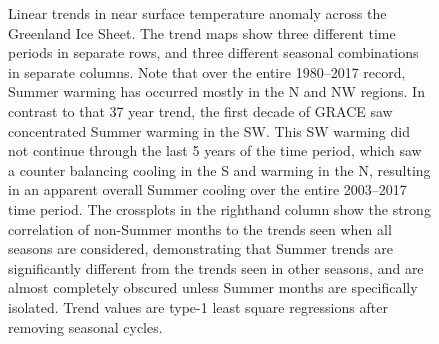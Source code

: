 \documentclass[11pt]{report}
\begin{document}
 \begin{figure}[h]
\centering
{}
\caption[Spatial Variability of Temperature Anomaly Trends]{Linear trends in near surface temperature anomaly across the Greenland Ice Sheet. The trend maps show three different time periods in separate rows, and three different seasonal combinations in separate columns. Note that over the entire 1980--2017 record, Summer warming has occurred mostly in the N and NW regions. In contrast to that 37 year trend, the first decade of GRACE saw concentrated Summer warming in the SW. This SW warming did not continue through the last 5 years of the time period, which saw a counter balancing cooling in the S and warming in the N, resulting in an apparent overall Summer cooling over the entire 2003--2017 time period. The crossplots in the righthand column show the strong correlation of non-Summer months to the trends seen when all seasons are considered, demonstrating that Summer trends are significantly different from the trends seen in other seasons, and are almost completely obscured unless Summer months are specifically isolated. Trend values are type-1 least square regressions after removing seasonal cycles.} \label{fig:tslopes}
\end{figure}
\end{document}
